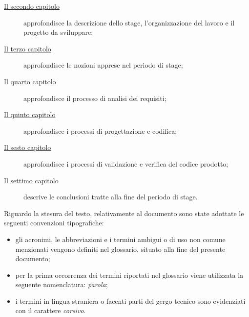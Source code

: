 \begin{description}
    \item[{\hyperref[cap:descrizione-stage]{Il secondo capitolo}}] approfondisce la descrizione dello stage, l'organizzazione del lavoro e il progetto da sviluppare;
    
    \item[{\hyperref[cap:nozioni-apprese]{Il terzo capitolo}}] approfondisce le nozioni apprese nel periodo di stage;
    
    \item[{\hyperref[cap:analisi-requisiti]{Il quarto capitolo}}] approfondisce il processo di analisi dei requisiti;
    
    \item[{\hyperref[cap:progettazione-codifica]{Il quinto capitolo}}] approfondisce i processi di progettazione e codifica;
    
    \item[{\hyperref[cap:verifica-validazione]{Il sesto capitolo}}] approfondisce i processi di validazione e verifica del codice prodotto;
    
    \item[{\hyperref[cap:conclusioni]{Il settimo capitolo}}] descrive le conclusioni tratte alla fine del periodo di stage.
\end{description}

Riguardo la stesura del testo, relativamente al documento sono state adottate le seguenti convenzioni tipografiche:
\begin{itemize}
	\item gli acronimi, le abbreviazioni e i termini ambigui o di uso non comune menzionati vengono definiti nel glossario, situato alla fine del presente documento;
	\item per la prima occorrenza dei termini riportati nel glossario viene utilizzata la seguente nomenclatura: \emph{parola}\glsfirstoccur;
	\item i termini in lingua straniera o facenti parti del gergo tecnico sono evidenziati con il carattere \emph{corsivo}.
\end{itemize}